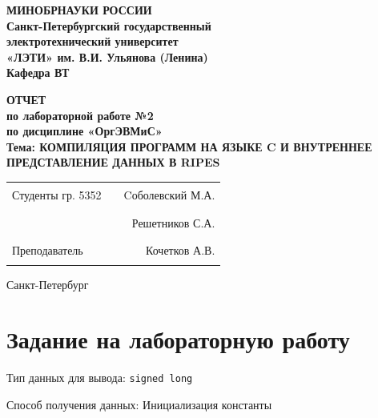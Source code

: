 \documentclass[12pt]{extarticle}
\begin{document}
\begin{center}
  \textbf{МИНОБРНАУКИ РОССИИ} \\
  \textbf{Санкт-Петербургский государственный} \\
  \textbf{электротехнический университет} \\
  \textbf{«ЛЭТИ» им. В.И. Ульянова (Ленина)} \\
  \textbf{Кафедра ВТ} \\
\end{center}

\vspace{0.25\textheight}

\begin{center}
\textbf{ОТЧЕТ} \\
\textbf{по лабораторной работе №2} \\
\textbf{по дисциплине «ОргЭВМиС»} \\
\textbf{Тема: КОМПИЛЯЦИЯ ПРОГРАММ НА ЯЗЫКЕ C И ВНУТРЕННЕЕ ПРЕДСТАВЛЕНИЕ ДАННЫХ В RIPES} \\
\end{center}

\vspace*{\fill}

\begin{center}
\begin{tabularx}{\textwidth}{ l X r }
 Студенты гр. 5352 & \rule{8cm}{0.2mm} & Cоболевский М.А. \\
 & \rule{8cm}{0.2mm} & Решетников С.А. \\
 Преподаватель & \rule{8cm}{0.2mm} & Кочетков А.В. \\
\end{tabularx}
\end{center}

\vspace{3em}

\begin{center}
Санкт-Петербург\\
\the\year
\end{center}

\thispagestyle{empty}

\pagebreak

\section{Задание на лабораторную работу}

Тип данных для вывода: \texttt{signed long}

Способ получения данных: Инициализация константы
\end{document}
